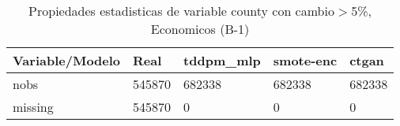 \begin{table}[H]
\centering
\fontsize{8}{14}\selectfont
\caption{Propiedades estadisticas de variable county con cambio\ensuremath{>}5\%, Economicos (B-1)}
\label{table-stats-economicos-b-1-county-short}
\begin{tabular}{|l|m{10em}|m{10em}|m{10em}|m{10em}|}
\hline
 \rowcolor[gray]{0.8}
Variable/Modelo & Real & tddpm\_mlp & smote-enc & ctgan \\
\hline nobs & 545870 & 682338 & 682338 & 682338 \\
\hline missing & 545870 & 0 & 0 & 0 \\
\hline
\end{tabular}
\end{table}
